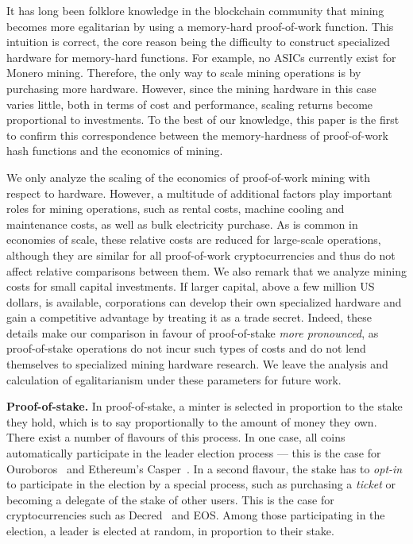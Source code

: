 It has long been folklore knowledge in the blockchain community that mining
becomes more egalitarian by using a memory-hard proof-of-work function. This
intuition is correct, the core reason being the difficulty to construct
specialized hardware for memory-hard functions. For example, no ASICs
currently exist for Monero mining.  Therefore, the only way to scale mining
operations is by purchasing more hardware. However, since the mining hardware
in this case varies little, both in terms of cost and performance, scaling
returns become proportional to investments.  To the best of our knowledge, this
paper is the first to confirm this correspondence between the
memory-hardness of proof-of-work hash functions and the economics of mining.

\begin{remark}\label{rmk:pow-scale}
We only analyze the scaling of the economics of proof-of-work mining with
respect to hardware. However, a multitude of
additional factors play important roles for mining operations, such as
rental costs, machine cooling and maintenance costs, as well as bulk
electricity purchase.  As is common in economies of scale, these relative
costs are reduced for large-scale operations, although they are similar for
all proof-of-work cryptocurrencies and thus do not affect relative
comparisons between them. We also remark that we analyze mining costs for
small capital investments. If larger capital, \eg above a few million US
dollars, is available, corporations can develop their own specialized
hardware and gain a competitive advantage by treating it as a trade secret.
Indeed, these details make our comparison in favour of proof-of-stake
\emph{more pronounced}, as proof-of-stake operations do not incur such
types of costs and do not lend themselves to specialized mining hardware
research. We leave the analysis and calculation of egalitarianism under
these parameters for future work.
\end{remark}

\noindent\textbf{Proof-of-stake.}
In proof-of-stake, a minter is selected in proportion to the stake they hold,
which is to say proportionally to the amount of money they own. There exist a
number of flavours of this process. In one case, all coins automatically
participate in the leader election process --- this is the case for Ouroboros~\cite{C:KRDO17} and
Ethereum's Casper~\cite{buterin2017casper}. In a second flavour, the stake has
to \emph{opt-in} to participate in the election by a special process, such as
purchasing a \emph{ticket} or becoming a delegate of the stake of other users.
This is the case for cryptocurrencies such as Decred~\cite{decred} and EOS. Among those
participating in the election, a leader is elected at random, in proportion to
their stake.

